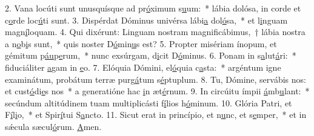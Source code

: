 2. Vana locúti sunt unusquísque ad pr\uline{ó}ximum s\uline{u}um:~* lábia dolósa, in corde et c\uline{o}rde loc\uline{ú}ti sunt.
3. Dispérdat Dóminus univérsa lábi\uline{a} dol\uline{ó}sa,~* et l\uline{i}nguam magn\uline{í}loquam.
4. Qui dixérunt: Linguam nostram magnificábimus,~† lábia nostra a n\uline{o}b\uline{i}s sunt,~* quis noster D\uline{ó}min\uline{u}s est?
5. Propter misériam ínopum, et gémitum p\uline{áu}p\uline{e}rum,~* nunc exsúrgam, d\uline{i}cit D\uline{ó}minus.
6. Ponam in s\uline{a}lut\uline{á}ri:~* fiduciáliter \uline{a}gam in \uline{e}o.
7. Elóquia Dómini, el\uline{ó}quia c\uline{a}sta:~* argéntum igne examinátum, probátum terræ purg\uline{á}tum s\uline{é}ptuplum.
8. Tu, Dómine, servábis nos: et cust\uline{ó}di\uline{e}s nos~* a generatióne hac \uline{i}n æt\uline{é}rnum.
9. In circúitu ímpii \uline{á}mb\uline{u}lant:~* secúndum altitúdinem tuam multiplicásti f\uline{í}lios h\uline{ó}minum.
10. Glória Patri, et F\uline{í}l\uline{i}o,~* et Spir\uline{í}tui S\uline{a}ncto.
11. Sicut erat in princípio, et n\uline{u}nc, et s\uline{e}mper,~* et in sǽcula sæcul\uline{ó}rum. \uline{A}men.
